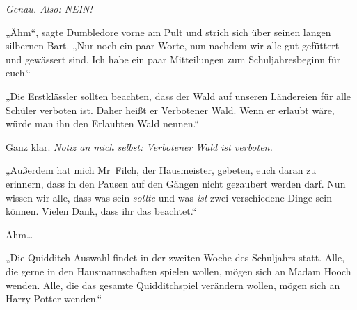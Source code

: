 \emph{Genau. Also: NEIN!}

„Ähm“, sagte Dumbledore vorne am Pult und strich sich über seinen langen silbernen Bart. „Nur noch ein paar Worte, nun nachdem wir alle gut gefüttert und gewässert sind. Ich habe ein paar Mitteilungen zum Schuljahresbeginn für euch.“

„Die Erstklässler sollten beachten, dass der Wald auf unseren Ländereien für alle Schüler verboten ist. Daher heißt er Verbotener Wald. Wenn er erlaubt wäre, würde man ihn den Erlaubten Wald nennen.“

Ganz klar. \emph{Notiz an mich selbst: Verbotener Wald ist verboten.}

„Außerdem hat mich Mr~Filch, der Hausmeister, gebeten, euch daran zu erinnern, dass in den Pausen auf den Gängen nicht gezaubert werden darf. Nun wissen wir alle, dass was sein \emph{sollte} und was \emph{ist} zwei verschiedene Dinge sein können. Vielen Dank, dass ihr das beachtet.“


Ähm…

„Die Quidditch-Auswahl findet in der zweiten Woche des Schuljahrs statt. Alle, die gerne in den Hausmannschaften spielen wollen, mögen sich an Madam Hooch wenden. Alle, die das gesamte Quidditchspiel verändern wollen, mögen sich an Harry Potter wenden.“

